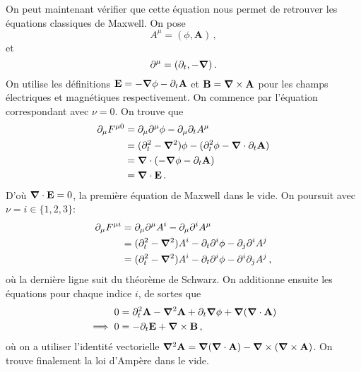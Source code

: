 \documentclass{article}
\numberwithin{equation}{section}
\theoremstyle{solution}
\begin{document}
On peut maintenant vérifier que cette équation nous permet de retrouver les équations classiques de Maxwell. On pose
\begin{equation}
        A^{\mu} = (\phi, \mathbf{A})\, ,
\end{equation} 
et
\begin{equation}
        \partial^{\mu} = (\partial_{t}, -\grad)\, .
\end{equation} 
On utilise les définitions $\mathbf{E} = -\grad \phi - \partial_t \mathbf{A}$ et $\mathbf{B} = \grad \times \mathbf{A}$ pour les 
champs électriques et magnétiques respectivement.
On commence par l'équation correspondant avec $\nu=0$.
On trouve que
\begin{align*}
        \partial_{\mu}F^{\mu 0} &= \partial_{\mu} \partial^{\mu}\phi - \partial_{\mu}\partial_{t}A^{\mu} \\
                &= (\partial_{t}^{2} - \grad^{2})\phi - (\partial_{t}^{2}\phi - \grad \cdot \partial_{t}\mathbf{A}) \\
                &= \grad \cdot (-\grad \phi - \partial_t \mathbf{A}) \\
                &= \grad \cdot \mathbf{E}\, .
\end{align*}
D'où $\grad \cdot \mathbf{E} = 0$, la première équation de Maxwell dans le vide.
On poursuit avec $\nu = i \in \{1,2,3\}$:
\begin{align*}
        \partial_{\mu}F^{\mu i} &= \partial_{\mu}\partial^{\mu}A^{i} - \partial_{\mu}\partial^{i}A^{\mu} \\
                &= (\partial_{t}^{2} - \grad^{2})A^{i} - \partial_{t}\partial^{i}\phi - \partial_{j}\partial^{i}A^{j} \\
                &= (\partial_{t}^{2} - \grad^{2})A^{i} - \partial_{t}\partial^{i}\phi - \partial^{i}\partial_j A^{j}\, ,
\end{align*}
où la dernière ligne suit du théorème de Schwarz. 
On additionne ensuite les équations pour chaque indice $i$, de sortes que 
\begin{align*}
        0 &= \partial_{t}^{2}\mathbf{A} - \grad^{2}\mathbf{A} + \partial_{t}\grad \phi + \grad (\grad \cdot \mathbf{A}) \\
        \implies 0 &= -\partial_{t}\mathbf{E} + \grad \times \mathbf{B}\, ,
\end{align*}
où on a utiliser l'identité vectorielle $\grad^{2}\mathbf{A} = \grad (\grad \cdot \mathbf{A}) - \grad \times (\grad \times \mathbf{A})$. On trouve finalement la loi d'Ampère dans le vide. 
\end{document}
